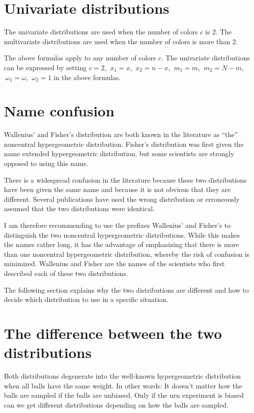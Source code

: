 \documentclass[a4paper]{article}
\begin{document}
\section{Univariate distributions}
%
The univariate distributions are used when the number of colors
$c$ is $2$. The multivariate distributions are used when the number 
of colors is more than $2$.

The above formulas apply to any number of colors $c$. The univariate
distributions can be expressed by setting 
$c=2$, $\:x_1=x$, $\:x_2=n-x$, $\:m_1=m$, $\:m_2=N-m$,
$\:\omega_1=\omega$, $\:\omega_2=1$
in the above formulas.


\section{Name confusion}
Wallenius' and Fisher's distribution are both known in the literature
as ``the'' noncentral hypergeometric distribution. Fisher's distribution
was first given the name extended hypergeometric distribution, but
some scientists are strongly opposed to using this name.

There is a widespread confusion in the literature because these two
distributions have been given the same name and because it is not obvious that
they are different. Several publications have used the wrong distribution
or erroneously assumed that the two distributions were identical.

I am therefore recommending to use the prefixes Wallenius' and Fisher's
to distinguish the two noncentral hypergeometric distributions. While this
makes the names rather long, it has the advantage of emphasizing that there
is more than one noncentral hypergeometric distribution, whereby the
risk of confusion is minimized. 
Wallenius and Fisher are the names of the scientists who first described each of
these two distributions.

The following section explains why the two distributions are different and
how to decide which distribution to use in a specific situation.


\section{The difference between the two distributions}
%
Both distributions degenerate into the well-known hypergeometric distribution
when all balls have the same weight. In other words: It doesn't matter how
the balls are sampled if the balls are unbiased. Only if the urn experiment
is biased can we get different distributions depending on how the balls are
sampled.
\end{document}
